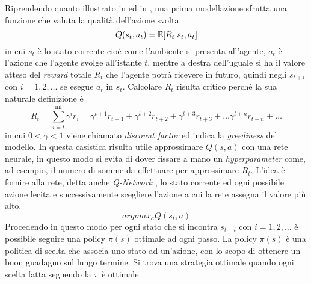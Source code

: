 Riprendendo quanto illustrato in \cite{MIT_RL} ed in \cite{Simple_RL}, una prima modellazione sfrutta una funzione che valuta la qualità dell'azione svolta 
$$
Q(s_t, a_t) = \mathbb{E} [ R_t | s_t, a_t]
$$
in cui 
$s_t$ è lo stato corrente cioè come l'ambiente si presenta all'agente,
$a_t$ è l'azione che l'agente svolge all'istante $t$,
mentre a destra dell'uguale si ha il valore atteso del \emph{reward} totale $R_t$ che l'agente potrà ricevere in futuro, quindi negli $s_{t+i}$ con $i=1,2,\dots$ se esegue $a_t$ in $s_t$.
Calcolare $R_t$ risulta critico perché la sua naturale definizione è
$$
R_t = \sum_{i=t}^{\inf} \gamma^i r_i = 
\gamma^{t+1} r_{t+1} + 
\gamma^{t+2} r_{t+2} + 
\gamma^{t+3} r_{t+3} + \dots
\gamma^{t+n} r_{t+n} + \dots
$$
in cui $0 < \gamma < 1$  viene chiamato \emph{discount factor} ed indica la \emph{greediness} del modello. %
In questa casistica risulta utile approssimare $Q(s,a)$ con una rete neurale, in questo modo si evita di dover fissare a mano un \emph{hyperparameter} come, ad esempio,  il numero di somme da effettuare per approssimare $R_t$.
L'idea è fornire alla rete, detta anche \emph{Q-Network} \cite{DQN}, lo stato corrente ed ogni possibile azione lecita e successivamente scegliere l'azione a cui la rete assegna il valore più alto.
$$
argmax_a Q(s_t, a) %
$$
Procedendo in questo modo per ogni stato che si incontra $s_{t+i}$ con $i=1,2,\dots$ è possibile seguire una policy $\pi(s)$ ottimale ad ogni passo.
La policy $\pi(s)$ è una politica di scelta che associa uno stato ad un'azione, con lo scopo di ottenere un buon guadagno sul lungo termine.
Si trova una strategia ottimale quando ogni scelta fatta seguendo la $\pi$ è ottimale.


